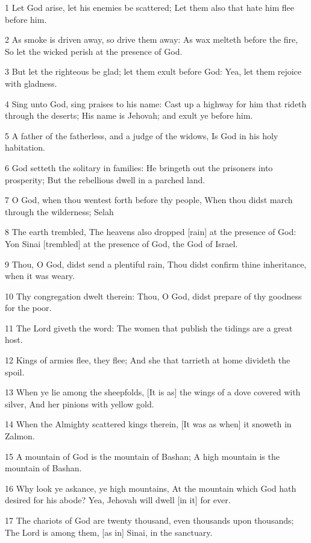 \par 1 Let God arise, let his enemies be scattered; Let them also that hate him flee before him.
\par 2 As smoke is driven away, so drive them away: As wax melteth before the fire, So let the wicked perish at the presence of God.
\par 3 But let the righteous be glad; let them exult before God: Yea, let them rejoice with gladness.
\par 4 Sing unto God, sing praises to his name: Cast up a highway for him that rideth through the deserts; His name is Jehovah; and exult ye before him.
\par 5 A father of the fatherless, and a judge of the widows, Is God in his holy habitation.
\par 6 God setteth the solitary in families: He bringeth out the prisoners into prosperity; But the rebellious dwell in a parched land.
\par 7 O God, when thou wentest forth before thy people, When thou didst march through the wilderness; Selah
\par 8 The earth trembled, The heavens also dropped [rain] at the presence of God: Yon Sinai [trembled] at the presence of God, the God of Israel.
\par 9 Thou, O God, didst send a plentiful rain, Thou didst confirm thine inheritance, when it was weary.
\par 10 Thy congregation dwelt therein: Thou, O God, didst prepare of thy goodness for the poor.
\par 11 The Lord giveth the word: The women that publish the tidings are a great host.
\par 12 Kings of armies flee, they flee; And she that tarrieth at home divideth the spoil.
\par 13 When ye lie among the sheepfolds, [It is as] the wings of a dove covered with silver, And her pinions with yellow gold.
\par 14 When the Almighty scattered kings therein, [It was as when] it snoweth in Zalmon.
\par 15 A mountain of God is the mountain of Bashan; A high mountain is the mountain of Bashan.
\par 16 Why look ye askance, ye high mountains, At the mountain which God hath desired for his abode? Yea, Jehovah will dwell [in it] for ever.
\par 17 The chariots of God are twenty thousand, even thousands upon thousands; The Lord is among them, [as in] Sinai, in the sanctuary.
